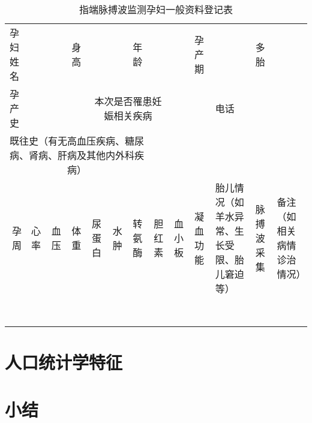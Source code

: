 \begin{table}[htbp]
    \centering
    \caption{指端脉搏波监测孕妇一般资料登记表}
      \begin{tabular}{|r|r|r|r|r|r|r|r|r|r|r|r|r|}
      \multicolumn{1}{l}{孕妇姓名} & \multicolumn{2}{c}{} & \multicolumn{1}{l}{身高} & \multicolumn{2}{c}{} & \multicolumn{1}{l}{年龄} & \multicolumn{2}{c}{} & \multicolumn{1}{l}{孕产期} & \multicolumn{1}{r}{} & \multicolumn{1}{l}{多胎} & \multicolumn{1}{r}{} \\
      \multicolumn{1}{l}{孕产史} & \multicolumn{3}{c}{}  & \multicolumn{4}{c}{本次是否罹患妊娠相关疾病} & \multicolumn{2}{c}{} & \multicolumn{1}{l}{电话} & \multicolumn{2}{c}{} \\
      \multicolumn{7}{c}{既往史（有无高血压疾病、糖尿病、肾病、肝病及其他内外科疾病）}    & \multicolumn{6}{c}{} \\
      \midrule
      \multicolumn{1}{|p{4.19em}|}{孕周} & \multicolumn{1}{l|}{心率} & \multicolumn{1}{l|}{血压} & \multicolumn{1}{l|}{体重} & \multicolumn{1}{l|}{尿蛋白} & \multicolumn{1}{l|}{水肿} & \multicolumn{1}{l|}{转氨酶} & \multicolumn{1}{l|}{胆红素} & \multicolumn{1}{l|}{血小板} & \multicolumn{1}{l|}{凝血功能} & \multicolumn{1}{l|}{胎儿情况（如羊水异常、生长受限、胎儿窘迫等）} & \multicolumn{1}{l|}{脉搏波采集} & \multicolumn{1}{l|}{备注（如相关病情诊治情况）} \\
      \midrule
            &       &       &       &       &       &       &       &       &       &       &       &  \\
      \midrule
            &       &       &       &       &       &       &       &       &       &       &       &  \\
      \midrule
            &       &       &       &       &       &       &       &       &       &       &       &  \\
      \midrule
            &       &       &       &       &       &       &       &       &       &       &       &  \\
      \midrule
            &       &       &       &       &       &       &       &       &       &       &       &  \\
      \midrule
            &       &       &       &       &       &       &       &       &       &       &       &  \\
      \midrule
            &       &       &       &       &       &       &       &       &       &       &       &  \\
      \midrule
            &       &       &       &       &       &       &       &       &       &       &       &  \\
      \bottomrule
      \end{tabular}%
    \label{tab:addlabel}%
\end{table}%
\section{人口统计学特征}
\section{小结}